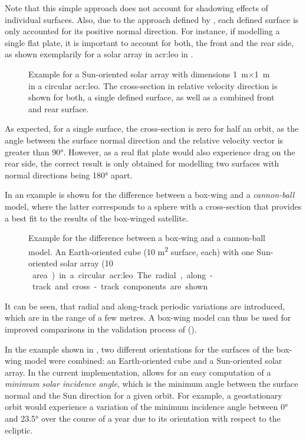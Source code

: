 Note that this simple approach does not account for shadowing effects of individual surfaces. Also, due to the approach defined by , each defined
surface is only accounted for its positive normal direction. For instance, if modelling a single flat plate, it is important to account for both, the front and the rear side, as
shown exemplarily for a solar array in \gls{acr:leo} in .
\begin{figure}[h!]
 \centering
 
 \caption{Example for a Sun-oriented solar array with dimensions \SI{1}{\metre}$\times$\SI{1}{\metre} in a circular \gls{acr:leo}. The
cross-section in relative velocity direction is shown for both, a single defined surface, as well as a combined front and rear surface.\label{fig:sat-model-solar-array}}
\end{figure}
As expected, for a single surface, the cross-section is zero for half an orbit, as the angle between the surface normal direction and the relative velocity vector is greater than 
\ang{90;;}. However, as a real flat plate would also experience drag on the rear side, the correct result is only obtained for modelling two surfaces with normal
directions being 
\ang{180;;} apart.

In  an example is shown for the difference between a box-wing and a \textit{cannon-ball} model, where the latter corresponds to a sphere with a
cross-section that provides a best fit to the results of the box-winged satellite.
\begin{figure}[h!]
 \centering
 
 \caption{Example for the difference between a box-wing and a cannon-ball model. An Earth-oriented cube (10 \si{\metre\squared} surface, each) with one Sun-oriented solar array
(10 \si{\metre\square} area) in a circular \gls{acr:leo}. The radial, along-track and cross-track components are shown.\label{fig:sat-model-box-wing}}
\end{figure}
It can be seen, that radial and along-track periodic variations are introduced, which are in the range of a few metres. A box-wing model can thus be used for improved comparisons
in the validation process of \neptune ().

In the example shown in , two different orientations for the surfaces of the box-wing model were combined: an Earth-oriented cube and a Sun-oriented
solar array. In the current implementation, \neptune allows for an easy computation of a \textit{minimum solar incidence angle}, which is the minimum angle between the surface normal and the Sun
direction for a given orbit. For example, a geostationary orbit would experience a variation of the minimum incidence angle between \ang{0;;} and \ang{23.5;;} over the course of a
year due to its orientation with respect to the ecliptic.




